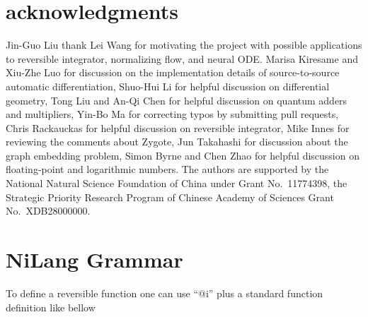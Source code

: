 \documentclass[aps,twocolumn,longbibliography,english,superscriptaddress]{revtex4-1}
\newcommand{\<}{\langle}
\renewcommand{\>}{\rangle}
\newcommand{\blue}[1]{[{\bf  \color{blue}{JG: #1}}]}
\theoremstyle{definition}\newtheorem{definition}{\textit{Definition}}
\begin{document}

\section{acknowledgments}
Jin-Guo Liu thank Lei Wang for motivating the project with possible applications to reversible integrator, normalizing flow, and neural ODE.
Marisa Kiresame and Xiu-Zhe Luo for discussion on the implementation details of source-to-source automatic differentiation,
Shuo-Hui Li for helpful discussion on differential geometry, Tong Liu and An-Qi Chen for helpful discussion on quantum adders and multipliers, Yin-Bo Ma for correcting typos by submitting pull requests, Chris Rackauckas for helpful discussion on reversible integrator, Mike Innes for reviewing the comments about Zygote, Jun Takahashi for discussion about the graph embedding problem, Simon Byrne and Chen Zhao for helpful discussion on floating-point and logarithmic numbers.
The authors are supported by the National Natural Science Foundation of China under Grant No.~11774398, the Strategic Priority Research Program of Chinese Academy of Sciences Grant No.~XDB28000000.




\pagebreak
\appendix

\section{NiLang Grammar}\label{app:grammar}

To define a reversible function one can use ``@i'' plus a standard function definition like bellow
\end{document}
